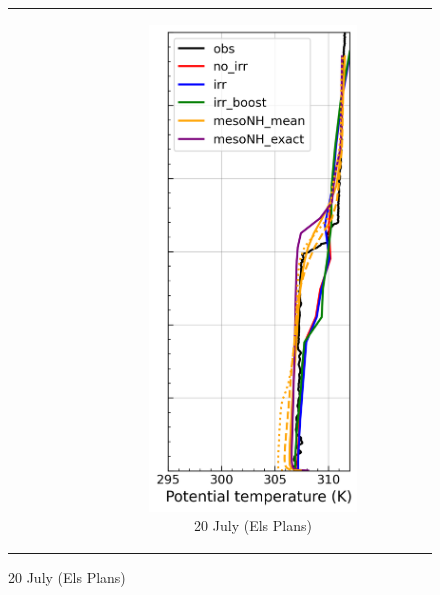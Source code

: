 \begin{figure}[hbtp]
{\begin{tabular}{@{}cccc@{}}
\begin{subfigure}[t]{0.29\textwidth}
        \end{subfigure} &
        \begin{subfigure}[t]{0.285\textwidth}
            \caption{20 July (Els Plans)}
            \includegraphics[width=\textwidth]{images/chap5/profiles/profile_elsplans_theta_2007_sensbins.png}

\end{subfigure}
\end{tabular}}
\end{figure}
